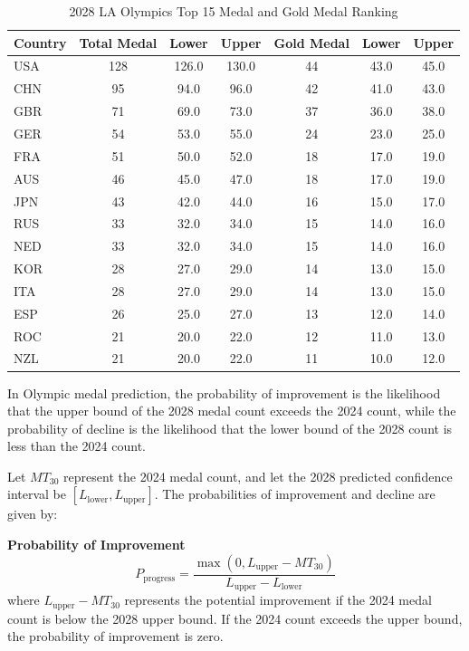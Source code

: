 \documentclass{mcmthesis}
\renewcommand{\arraystretch}{1.2}
\begin{document}
\begin{table}[H]
	\centering
	\caption{2028 LA Olympics Top 15 Medal and Gold Medal Ranking}
	\label{tab:combined_medals}
	\renewcommand{\arraystretch}{1.2}
	\begin{tabularx}{\textwidth}{l|ccc|ccc}
		\toprule
		\rowcolor{red!10}
		\textbf{Country} & \textbf{Total Medal} & \textbf{Lower} & \textbf{Upper} & \textbf{Gold Medal} & \textbf{Lower} & \textbf{Upper} \\
		\midrule
		\rowcolor{gray!10}
		USA & 128 & 126.0 & 130.0 & 44 & 43.0 & 45.0 \\
		CHN & 95 & 94.0 & 96.0 & 42 & 41.0 & 43.0 \\
		\rowcolor{gray!10}
		GBR & 71 & 69.0 & 73.0 & 37 & 36.0 & 38.0 \\
		GER & 54 & 53.0 & 55.0 & 24 & 23.0 & 25.0 \\
		\rowcolor{gray!10}
		FRA & 51 & 50.0 & 52.0 & 18 & 17.0 & 19.0 \\
		AUS & 46 & 45.0 & 47.0 & 18 & 17.0 & 19.0 \\
		\rowcolor{gray!10}
		JPN & 43 & 42.0 & 44.0 & 16 & 15.0 & 17.0 \\
		RUS & 33 & 32.0 & 34.0 & 15 & 14.0 & 16.0 \\
		\rowcolor{gray!10}
		NED & 33 & 32.0 & 34.0 & 15 & 14.0 & 16.0 \\
		KOR & 28 & 27.0 & 29.0 & 14 & 13.0 & 15.0 \\
		\rowcolor{gray!10}
		ITA & 28 & 27.0 & 29.0 & 14 & 13.0 & 15.0 \\
		ESP & 26 & 25.0 & 27.0 & 13 & 12.0 & 14.0 \\
		\rowcolor{gray!10}
		ROC & 21 & 20.0 & 22.0 & 12 & 11.0 & 13.0 \\
		NZL & 21 & 20.0 & 22.0 & 11 & 10.0 & 12.0 \\
		\bottomrule
	\end{tabularx}
	\label{12}
\end{table}


In Olympic medal prediction, the probability of improvement is the likelihood that the upper bound of the 2028 medal count exceeds the 2024 count, while the probability of decline is the likelihood that the lower bound of the 2028 count is less than the 2024 count.

Let \( MT_{30} \) represent the 2024 medal count, and let the 2028 predicted confidence interval be \([L_{\text{lower}}, L_{\text{upper}}]\). The probabilities of improvement and decline are given by:


\textbf{Probability of Improvement}
\[
P_{\text{progress}} = \frac{\max(0, L_{\text{upper}} - MT_{30})}{L_{\text{upper}} - L_{\text{lower}}}
\]
where \( L_{\text{upper}} - MT_{30} \) represents the potential improvement if the 2024 medal count is below the 2028 upper bound. If the 2024 count exceeds the upper bound, the probability of improvement is zero.
\end{document}
